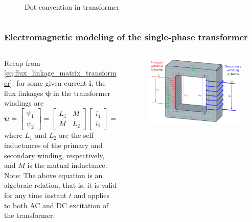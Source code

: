 \begin{frame}
\begin{columns}
\begin{column}{0.25\textwidth}
\begin{figure}
                \caption{Dot convention in transformer}
			\end{figure}
      \end{column}
    \end{columns}  
\end{frame}

\begin{frame}
	\frametitle{Electromagnetic modeling of the single-phase transformer}
    \begin{columns}
		\begin{column}{0.45\textwidth}
            Recap from \eqref{eq:flux_linkage_matrix_transformer}: for some given current $\bm{i}$, the flux linkages $\bm{\psi}$ in the transformer windings are
			\begin{equation*}
				\bm{\psi} = \begin{bmatrix} \psi_1 \\ \psi_2 \end{bmatrix} = \begin{bmatrix} L_1 & M \\ M & L_2 \end{bmatrix} \begin{bmatrix} i_1 \\ i_2 \end{bmatrix} = \bm{L}\bm{i}
			\end{equation*}
			where $L_1$ and $L_2$ are the self-inductances of the primary and secondary winding, respectively, and $M$ is the mutual inductance.
			\\[1em] \pause
			Note: The above equation is an algebraic relation, that is, it is valid for any time instant $t$ and applies to both AC and DC excitation of the transformer. 
		\end{column}
        \hfill
		\begin{column}{0.525\textwidth}
			\onslide<1->
			\begin{figure}
				\centering
				\includegraphics[height=0.575\textheight]{fig/lec02/Transformer3d_col3.pdf}

\end{figure}
\end{column}
\end{columns}
\end{frame}
